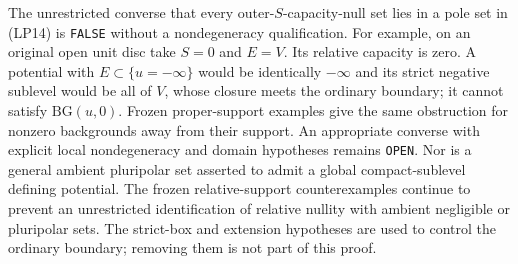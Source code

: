 The unrestricted converse that every outer-$S$-capacity-null set
lies in a pole set in (LP14) is \texttt{FALSE} without a
nondegeneracy qualification. For example, on an original open
unit disc take $S=0$ and $E=V$. Its relative capacity is zero.
A potential with $E\subset\{u=-\infty\}$ would be identically
$-\infty$ and its strict negative sublevel would be all of $V$,
whose closure meets the ordinary boundary; it cannot satisfy
$\mathrm{BG}(u,0)$. Frozen proper-support examples give the
same obstruction for nonzero backgrounds away from their support.
An appropriate converse with explicit local nondegeneracy and
domain hypotheses remains \texttt{OPEN}. Nor is a general
ambient pluripolar set asserted to admit a global compact-sublevel
defining potential. The frozen relative-support counterexamples
continue to prevent an unrestricted identification of relative
nullity with ambient negligible or pluripolar sets.
The strict-box and extension hypotheses are used to control
the ordinary boundary; removing them is not part of this proof.

